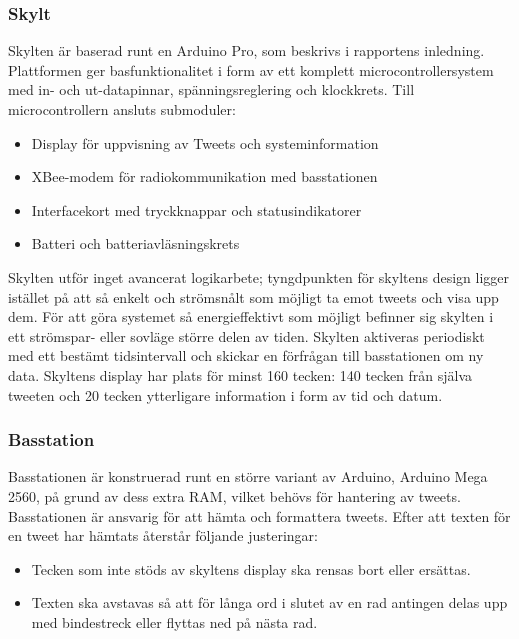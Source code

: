 \documentclass[a4paper,11pt]{article}
\begin{document}
\subsubsection{Skylt}
Skylten är baserad runt en Arduino Pro, som beskrivs i rapportens inledning. Plattformen ger basfunktionalitet i form av ett komplett microcontrollersystem med in- och ut-datapinnar, spänningsreglering och klockkrets. Till microcontrollern ansluts submoduler:
	
	\begin{itemize}
    	\item Display för uppvisning av Tweets och systeminformation
    	\item XBee-modem för radiokommunikation med basstationen
    	\item Interfacekort med tryckknappar och statusindikatorer
    	\item Batteri och batteriavläsningskrets
	\end{itemize}
	
Skylten utför inget avancerat logikarbete; tyngdpunkten för skyltens design ligger istället på att så enkelt och strömsnålt som möjligt ta emot tweets och visa upp dem. För att göra systemet så energieffektivt som möjligt befinner sig skylten i ett strömspar- eller sovläge större delen av tiden. Skylten aktiveras periodiskt med ett bestämt tidsintervall och skickar en förfrågan till basstationen om ny data. Skyltens display har plats för minst 160 tecken: 140 tecken från själva tweeten och 20 tecken ytterligare information i form av tid och datum.

\subsubsection{Basstation}
Basstationen är konstruerad runt en större variant av Arduino, Arduino Mega 2560, på grund av dess extra RAM, vilket behövs för hantering av tweets. Basstationen är ansvarig för att hämta och formattera tweets. Efter att texten för en tweet har hämtats återstår följande justeringar:
	
	\begin{itemize}
    	\item Tecken som inte stöds av skyltens display ska rensas bort eller ersättas.
    	\item Texten ska avstavas så att för långa ord i slutet av en rad antingen delas upp med bindestreck eller flyttas ned på nästa rad.	
	\end{itemize}
	
\end{document}

